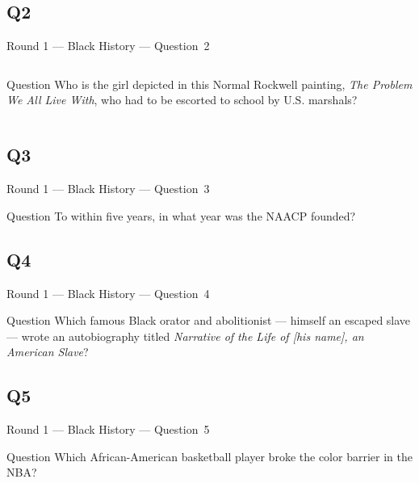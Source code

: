 \documentclass[11pt]{beamer}
\begin{document}
\subsection*{Q2}
\begin{frame}[t]{Round 1 --- Black History --- \mbox{Question 2}}
\vspace{-0.5em}
\begin{columns}[T,totalwidth=\linewidth]
\begin{column}{0.32\linewidth}
\begin{block}{Question}
Who is the girl depicted in this Normal Rockwell painting, \emph{The Problem We All Live With}, who had to be escorted to school by U.S. marshals?
\end{block}
\end{column}
\begin{column}{0.65\linewidth}
\begin{center}
\texttt{[image: \{Images/rubybridges]}.jpg}
\end{center}
\end{column}
\end{columns}
\end{frame}
\subsection*{Q3}
\begin{frame}[t]{Round 1 --- Black History --- \mbox{Question 3}}
\vspace{-0.5em}
\begin{block}{Question}
To within five years, in what year was the NAACP founded?
\end{block}
\end{frame}
\subsection*{Q4}
\begin{frame}[t]{Round 1 --- Black History --- \mbox{Question 4}}
\vspace{-0.5em}
\begin{block}{Question}
Which famous Black orator and abolitionist --- himself an escaped slave --- wrote an autobiography titled \emph{Narrative of the Life of [his name], an American Slave}?
\end{block}
\end{frame}
\subsection*{Q5}
\begin{frame}[t]{Round 1 --- Black History --- \mbox{Question 5}}
\vspace{-0.5em}
\begin{block}{Question}
Which African-American basketball player broke the color barrier in the NBA\@?
\end{block}
\end{frame}
\end{document}
